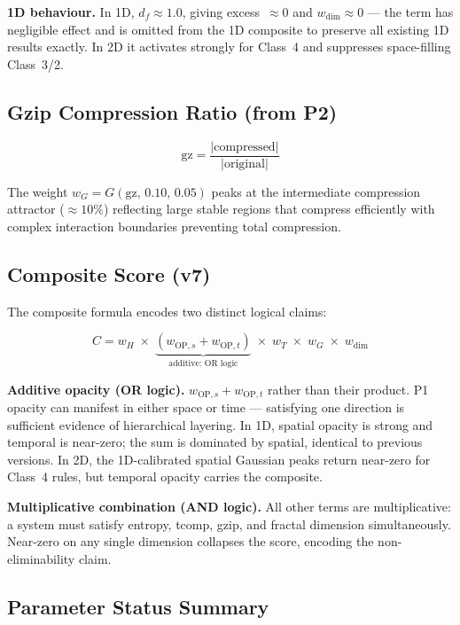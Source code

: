 \documentclass[12pt,a4paper]{article}
\begin{document}
\textbf{1D behaviour.}
In 1D, $d_f\approx1.0$, giving excess~$\approx0$ and
$w_\text{dim}\approx0$ --- the term has negligible effect and is
omitted from the 1D composite to preserve all existing 1D results
exactly.
In 2D it activates strongly for Class~4 and suppresses space-filling
Class~3/2.

\subsection{Gzip Compression Ratio (from P2)}

\begin{equation}
\text{gz} = \frac{|\text{compressed}|}{|\text{original}|}
\label{eq:gz}
\end{equation}

The weight $w_G = G(\text{gz},\,0.10,\,0.05)$ peaks at the
intermediate compression attractor ($\approx\!10\%$) reflecting large
stable regions that compress efficiently with complex interaction
boundaries preventing total compression.

\subsection{Composite Score (v7)}

The composite formula encodes two distinct logical claims:

\begin{equation}
\boxed{C = w_H \;\times\;
           \underbrace{(w_{\text{OP},s} + w_{\text{OP},t})}_{\text{additive: OR logic}}
           \;\times\; w_T \;\times\; w_G \;\times\; w_\text{dim}}
\label{eq:composite}
\end{equation}

\textbf{Additive opacity (OR logic).}
$w_{\text{OP},s} + w_{\text{OP},t}$ rather than their product.
P1 opacity can manifest in either space or time --- satisfying one
direction is sufficient evidence of hierarchical layering.
In 1D, spatial opacity is strong and temporal is near-zero; the sum
is dominated by spatial, identical to previous versions.
In 2D, the 1D-calibrated spatial Gaussian peaks return near-zero for
Class~4 rules, but temporal opacity carries the composite.

\textbf{Multiplicative combination (AND logic).}
All other terms are multiplicative: a system must satisfy entropy,
tcomp, gzip, and fractal dimension simultaneously.
Near-zero on any single dimension collapses the score, encoding the
non-eliminability claim.

\subsection{Parameter Status Summary}
\end{document}
